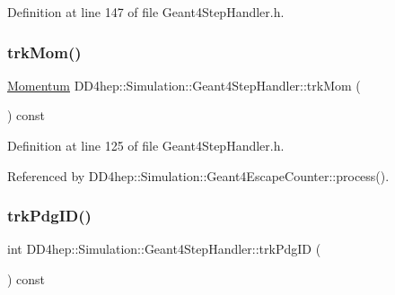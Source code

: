 Definition at line 147 of file Geant4\+Step\+Handler.\+h.

\hypertarget{class_d_d4hep_1_1_simulation_1_1_geant4_step_handler_a28d90fb5cec49ff63a1741526a1e4d02}{}\label{class_d_d4hep_1_1_simulation_1_1_geant4_step_handler_a28d90fb5cec49ff63a1741526a1e4d02} 
\subsubsection{\texorpdfstring{trk\+Mom()}{trkMom()}}
{\footnotesize\ttfamily \hyperlink{namespace_d_d4hep_1_1_simulation_aead01eb580dc503a5abba194d179c963}{Momentum} D\+D4hep\+::\+Simulation\+::\+Geant4\+Step\+Handler\+::trk\+Mom (\begin{DoxyParamCaption}{ }\end{DoxyParamCaption}) const\hspace{0.3cm}{\ttfamily [inline]}}



Definition at line 125 of file Geant4\+Step\+Handler.\+h.



Referenced by D\+D4hep\+::\+Simulation\+::\+Geant4\+Escape\+Counter\+::process().

\hypertarget{class_d_d4hep_1_1_simulation_1_1_geant4_step_handler_a30aa9c15093a6ffef6402e1a41a1c82f}{}\label{class_d_d4hep_1_1_simulation_1_1_geant4_step_handler_a30aa9c15093a6ffef6402e1a41a1c82f} 
\subsubsection{\texorpdfstring{trk\+Pdg\+I\+D()}{trkPdgID()}}
{\footnotesize\ttfamily int D\+D4hep\+::\+Simulation\+::\+Geant4\+Step\+Handler\+::trk\+Pdg\+ID (\begin{DoxyParamCaption}{ }\end{DoxyParamCaption}) const\hspace{0.3cm}{\ttfamily [inline]}}



